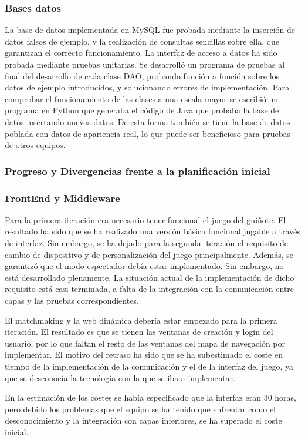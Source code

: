 \subsubsection*{Bases datos}
La base de datos implementada en MySQL fue probada mediante la inserción de datos falsos de ejemplo, y la realización de consultas sencillas sobre ella, que garantizan el correcto funcionamiento. La interfaz de acceso a datos ha sido probada mediante pruebas unitarias. Se desarrolló un programa de pruebas al final del desarrollo de cada clase DAO, probando función a función sobre los datos de ejemplo introducidos, y solucionando errores de implementación. Para comprobar el funcionamiento de las clases a una escala mayor se escribió un programa en Python que generaba el código de Java que probaba la base de datos insertando nuevos datos. De esta forma también se tiene la base de datos poblada con datos de apariencia real, lo que puede ser beneficioso para pruebas de otros equipos.

\subsubsection*{Progreso y Divergencias frente a la planificación inicial}
\subsubsection*{FrontEnd y Middleware}
Para la primera iteración era necesario tener funcional el juego del guiñote. El resultado ha sido que se ha realizado una versión básica funcional jugable a través de interfaz. Sin embargo, se ha dejado para la segunda iteración el requisito de cambio de dispositivo y de personalización del juego principalmente. Además, se garantizó que el modo espectador debía estar implementado. Sin embargo, no está desarrollado plenamente. La situación actual de la implementación de dicho requisito está casi terminada, a falta de la integración con la comunicación entre capas y las pruebas correspondientes.

El matchmaking y la web dinámica debería estar empezado para la primera iteración. El resultado es que se tienen las ventanas de creación y login del usuario, por lo que faltan el resto de las ventanas del mapa de navegación por implementar. El motivo del retraso ha sido que se ha subestimado el coste en tiempo de la implementación de la comunicación y el de la interfaz del juego, ya que se desconocía la tecnología con la que se iba a implementar.

En la estimación de los costes se había especificado que la interfaz eran 30 horas, pero debido los problemas que el equipo se ha tenido que enfrentar como el desconocimiento y la integración con capas inferiores, se ha superado el coste inicial.

